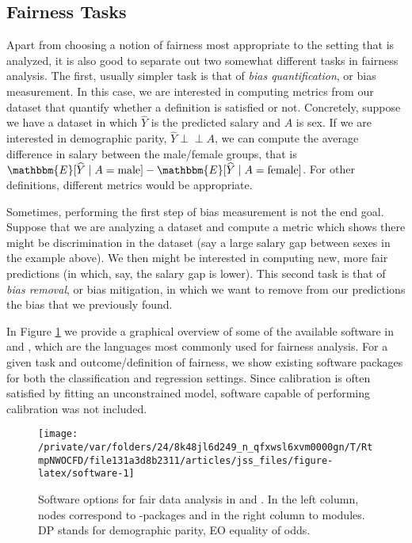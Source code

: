 \documentclass[
  nojss]{jss}
\begin{document}
\hypertarget{fairness-tasks}{%
\subsection{Fairness Tasks}\label{fairness-tasks}}

Apart from choosing a notion of fairness most appropriate to the setting
that is analyzed, it is also good to separate out two somewhat different
tasks in fairness analysis. The first, usually simpler task is that of
\emph{bias quantification}, or bias measurement. In this case, we are
interested in computing metrics from our dataset that quantify whether a
definition is satisfied or not. Concretely, suppose we have a dataset in
which \(\widehat{Y}\) is the predicted salary and \(A\) is sex. If we
are interested in demographic parity,
\(\widehat{Y} {\perp\!\!\!\perp}A\), we can compute the average
difference in salary between the male/female groups, that is
\(\mathbbm{E}[\widehat{Y} \mid A = \text{male}] - \mathbbm{E}[\widehat{Y} \mid A = \text{female}]\).
For other definitions, different metrics would be appropriate.

Sometimes, performing the first step of bias measurement is not the end
goal. Suppose that we are analyzing a dataset and compute a metric which
shows there might be discrimination in the dataset (say a large salary
gap between sexes in the example above). We then might be interested in
computing new, more fair predictions (in which, say, the salary gap is
lower). This second task is that of \emph{bias removal}, or bias
mitigation, in which we want to remove from our predictions the bias
that we previously found.

In Figure \ref{fig:software} we provide a graphical overview of some of
the available software in  and , which are
the languages most commonly used for fairness analysis. For a given task
and outcome/definition of fairness, we show existing software packages
for both the classification and regression settings. Since calibration
is often satisfied by fitting an unconstrained model, software capable
of performing calibration was not included.

\begin{CodeChunk}
\begin{figure}

{\centering \texttt{[image: /private/var/folders/24/8k48jl6d249\_n\_qfxwsl6xvm0000gn/T/RtmpNWOCFD/file131a3d8b2311/articles/jss\_files/figure-latex/software-1]} 

}

\caption{Software options for fair data analysis in  and . In the left column, nodes correspond to -packages and in the right column to  modules. DP stands for demographic parity, EO equality of odds.}\label{fig:software}
\end{figure}
\end{CodeChunk}
\end{document}
